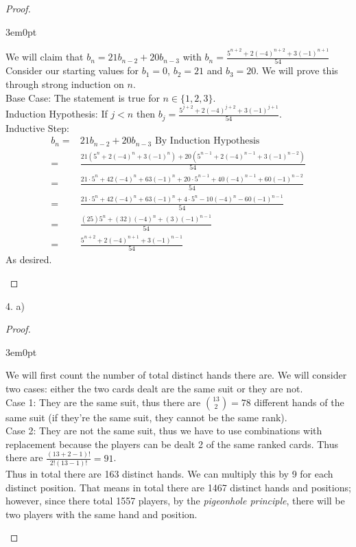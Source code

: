 \documentclass[11pt]{article}
\newenvironment{myproof}
{\begin{proof} \begin{adjustwidth}{3em}{0pt}$ $\par\nobreak\ignorespaces}
{\end{adjustwidth} \end{proof}}
\begin{document}
\begin{flushleft}
\begin{myproof}
We will claim that $b_n = 21 b_{n-2} + 20 b_{n-3}$ with $b_n = \frac{5^{n+2}+2(-4)^{n+2}+3(-1)^{n+1}}{54}$ Consider our starting values for $b_1 = 0$, $b_2 = 21$ and $b_3 = 20$. We will prove this through strong induction on $n$. \\
\bigskip
Base Case: The statement is true for $n \in \{ 1,2,3 \}$. \\
\bigskip
Induction Hypothesis: If $j < n$ then $b_j = \frac{5^{j+2}+2(-4)^{j+2}+3(-1)^{j+1}}{54}$. \\
Inductive Step:
\begin{align*}
b_n = & 21 b_{n-2} + 20 b_{n-3}  \text{ By Induction Hypothesis} \\
= & \frac{21(5^{n}+2(-4)^{n}+3(-1)^{n}) + 20 (5^{n-1}+2(-4)^{n-1}+3(-1)^{n-2}) }{54}  \\
= & \frac{21 \cdot 5^n + 42(-4)^n + 63(-1)^n+20 \cdot 5^{n-1} +40(-4)^{n-1} + 60(-1)^{n-2}}{54} \\
= & \frac{21 \cdot 5^n + 42(-4)^n + 63(-1)^n+4 \cdot 5^{n} -10(-4)^{n} - 60(-1)^{n-1}}{54} \\
= & \frac{(25)5^n + (32)(-4)^n+(3)(-1)^{n-1}}{54} \\
= & \frac{5^{n+2} + 2(-4)^{n+1} + 3(-1)^{n-1}}{54}
\end{align*}
As desired.
\end{myproof}

\newpage

4. a)

\begin{myproof}
We will first count the number of total distinct hands there are. We will consider two cases: either the two cards dealt are the same suit or they are not.\\
\bigskip
Case 1: They are the same suit, thus there are ${13 \choose 2} = 78$ different hands of the same suit (if they're the same suit, they cannot be the same rank). \\
\bigskip
Case 2: They are not the same suit, thus we have to use combinations with replacement because the players can be dealt 2 of the same ranked cards. Thus there are $\frac{(13 + 2 -1)!}{2!(13-1)!} = 91$. \\
\bigskip
Thus in total there are 163 distinct hands. We can multiply this by 9 for each distinct position. That means in total there are 1467 distinct hands and positions; however, since there total 1557 players, by the \textit{pigeonhole principle}, there will be two players with the same hand and position.
\end{myproof}


\end{flushleft}
\end{document}
